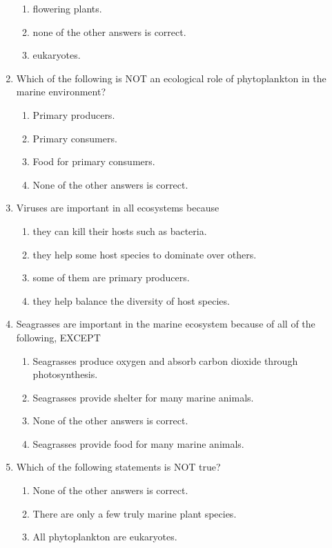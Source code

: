 \documentclass{report}
\begin{document}
\begin{enumerate}
\begin{enumerate}
        \item   flowering plants. 
        \item   none of the other answers is correct. 
        \item   eukaryotes. 
    \end{enumerate}
    \item Which of the following is NOT an ecological role of phytoplankton in the marine environment?
    \begin{enumerate}
        \item   Primary producers. 
        \item   Primary consumers. 
        \item   Food for primary consumers. 
        \item   None of the other answers is correct. 
    \end{enumerate}
    \item Viruses are important in all ecosystems because
    \begin{enumerate}
        \item   they can kill their hosts such as bacteria. 
        \item   they help some host species to dominate over others. 
        \item   some of them are primary producers. 
        \item   they help balance the diversity of host species. 
    \end{enumerate}
    \item Seagrasses are important in the marine ecosystem because of all of the following, EXCEPT
    \begin{enumerate}
        \item   Seagrasses produce oxygen and absorb carbon dioxide through photosynthesis.
        \item   Seagrasses provide shelter for many marine animals. 
        \item   None of the other answers is correct. 
        \item   Seagrasses provide food for many marine animals. 
    \end{enumerate}
    \item   Which of the following statements is NOT true? 
    \begin{enumerate}
        \item   None of the other answers is correct. 
        \item   There are only a few truly marine plant species. 
        \item   All phytoplankton are eukaryotes. 

\end{enumerate}
\end{enumerate}
\end{document}
